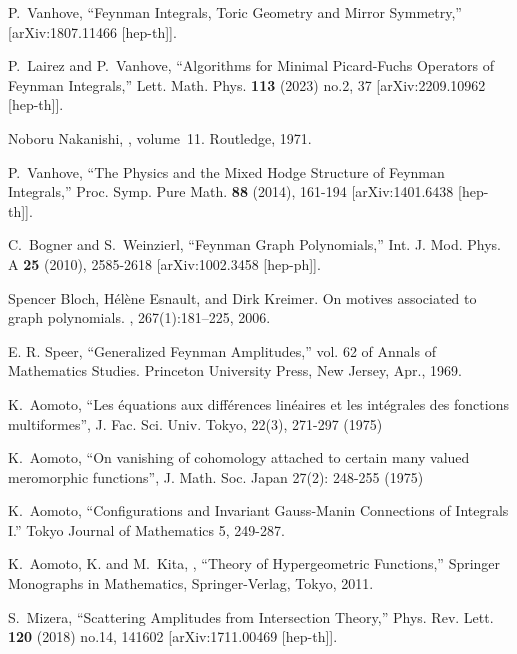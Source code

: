 \documentclass[a4paper,12pt]{article}
\numberwithin{equation}{section}
\numberwithin{figure}{section}
\begin{document}
\begin{thebibliography}{99}
P.~Vanhove,
``Feynman Integrals, Toric Geometry and Mirror Symmetry,''
[arXiv:1807.11466 [hep-th]].
  
P.~Lairez and P.~Vanhove,
``Algorithms for Minimal Picard-Fuchs Operators of Feynman Integrals,''
Lett. Math. Phys. \textbf{113} (2023) no.2, 37
[arXiv:2209.10962 [hep-th]].


Noboru Nakanishi,
, volume~11.
\newblock Routledge, 1971.

  
P.~Vanhove,
``The Physics and the Mixed Hodge Structure of Feynman Integrals,''
Proc. Symp. Pure Math. \textbf{88} (2014), 161-194
[arXiv:1401.6438 [hep-th]].


C.~Bogner and S.~Weinzierl,
``Feynman Graph Polynomials,''
Int. J. Mod. Phys. A \textbf{25} (2010), 2585-2618
[arXiv:1002.3458 [hep-ph]].

  
Spencer Bloch, H{\'e}l{\`e}ne Esnault, and Dirk Kreimer.
\newblock On motives associated to graph polynomials.
,
267(1):181--225, 2006.

  E. R. Speer, ``Generalized Feynman Amplitudes,'' vol. 62 of Annals of Mathematics Studies. Princeton University Press, New Jersey, Apr., 1969.
  


    K.~Aomoto, ``Les \'equations aux diff\'erences
     lin\'eaires et les int\'egrales des fonctions multiformes'',
     J. Fac. Sci. Univ. Tokyo, 22(3), 271-297  (1975)

   K.~Aomoto, ``On vanishing of cohomology attached to
    certain many valued meromorphic functions'', J. Math. Soc. Japan
    27(2): 248-255 (1975)

  
  K.~Aomoto, ``Configurations and Invariant Gauss-Manin Connections of Integrals I.'' Tokyo Journal of Mathematics 5, 249-287. %

     K.~Aomoto, K. and M.~Kita, , ``Theory of
      Hypergeometric Functions,'' Springer Monographs in Mathematics,
      Springer-Verlag, Tokyo, 2011.

      
S.~Mizera,
``Scattering Amplitudes from Intersection Theory,''
Phys. Rev. Lett. \textbf{120} (2018) no.14, 141602
[arXiv:1711.00469 [hep-th]].


\end{thebibliography}
\end{document}
